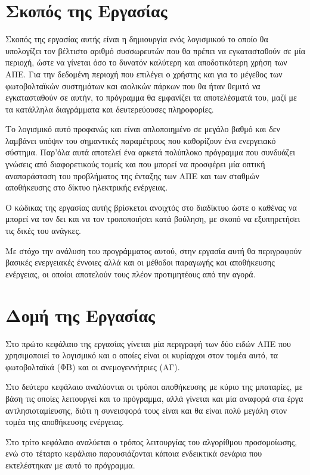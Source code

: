 \documentclass[12pt]{report}
\begin{document}
\chapter*{Σκοπός της Εργασίας}
Σκοπός της εργασίας αυτής είναι η δημιουργία ενός λογισμικού το οποίο θα υπολογίζει τον βέλτιστο αριθμό συσσωρευτών που θα πρέπει να εγκατασταθούν σε μία περιοχή, ώστε να γίνεται όσο το δυνατόν καλύτερη και 
αποδοτικότερη χρήση των ΑΠΕ. Για την δεδομένη περιοχή που επιλέγει ο χρήστης και για το μέγεθος των φωτοβολταϊκών συστημάτων και αιολικών πάρκων που θα ήταν θεμιτό να εγκατασταθούν σε αυτήν, το πρόγραμμα θα εμφανίζει τα
αποτελέσματά του, μαζί με τα κατάλληλα διαγράμματα και δευτερεύουσες πληροφορίες.

Το λογισμικό αυτό προφανώς και είναι απλοποιημένο σε μεγάλο βαθμό και δεν λαμβάνει υπόψιν του σημαντικές παραμέτρους που καθορίζουν ένα ενεργειακό σύστημα. Παρ'όλα αυτά αποτελεί ένα αρκετά πολύπλοκο πρόγραμμα που συνδυάζει γνώσεις
από διαφορετικούς τομείς και που μπορεί να προσφέρει μία οπτική αναπαράσταση του προβλήματος της ένταξης των ΑΠΕ και των σταθμών αποθήκευσης στο δίκτυο ηλεκτρικής ενέργειας.

Ο κώδικας της εργασίας αυτής βρίσκεται ανοιχτός στο διαδίκτυο ώστε ο καθένας να μπορεί να τον δει και να τον τροποποιήσει κατά βούληση, με σκοπό να εξυπηρετήσει 
τις δικές του ανάγκες.

Με στόχο την ανάλυση του προγράμματος αυτού, στην εργασία αυτή θα περιγραφούν βασικές ενεργειακές έννοιες αλλά και οι μέθοδοι παραγωγής και αποθήκευσης ενέργειας, οι οποίοι αποτελούν τους πλέον προτιμητέους από την αγορά. 

\chapter*{Δομή της Εργασίας}
Στο πρώτο κεφάλαιο της εργασίας γίνεται μία περιγραφή των δύο ειδών ΑΠΕ που χρησιμοποιεί το λογισμικό και ο οποίες είναι οι κυρίαρχοι στον τομέα αυτό, τα φωτοβολταϊκά (ΦΒ) και οι ανεμογεννήτριες (ΑΓ).

Στο δεύτερο κεφάλαιο αναλύονται οι τρόποι αποθήκευσης με κύριο της μπαταρίες, με βάση τις οποίες λειτουργεί και το πρόγραμμα, αλλά γίνεται και μία αναφορά στα έργα αντλησιοταμίευσης, διότι η συνεισφορά τους είναι και θα είναι
πολύ μεγάλη στον τομέα της αποθήκευσης ενέργειας.

Στο τρίτο κεφάλαιο αναλύεται ο τρόπος λειτουργίας του αλγορίθμου προσομοίωσης, ενώ στο τέταρτο κεφάλαιο παρουσιάζονται κάποια ενδεικτικά σενάρια που εκτελέστηκαν με αυτό το πρόγραμμα.
\end{document}
